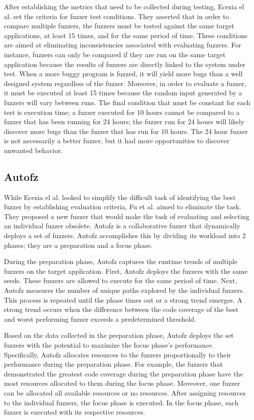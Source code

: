 After establishing the metrics that need to be collected during testing, Ecezia el al. 
set the criteria for fuzzer test conditions. They asserted that in order to compare 
multiple fuzzers, the fuzzers must be tested against the same target applications, at 
least 15 times, and for the same period of time. These conditions are aimed at eliminating 
inconsistencies associated with evaluating fuzzers. For instance, fuzzers can only be 
compared if they are run on the same target application because the results of fuzzers 
are directly linked to the system under test. When a more buggy program is fuzzed, it 
will yield more bugs than a well designed system regardless of the fuzzer. Moreover, 
in order to evaluate a fuzzer, it must be executed at least 15 times because the random 
input generated by a fuzzers will vary between runs. The final condition that must be 
constant for each test is execution time; a fuzzer executed for 10 hours cannot be 
compared to a fuzzer that has been running for 24 hours; the fuzzer run for 24 hours 
will likely discover more bugs than the fuzzer that has run for 10 hours. The 24 hour 
fuzzer is not necessarily a better fuzzer, but it had more opportunities to discover 
unwanted behavior. \cite{Ecezia}

\subsection{Autofz}
While Ecezia el al. looked to simplify the difficult task of identifying the best 
fuzzer by establishing evaluation criteria, Fu et al. aimed to eliminate the task. 
They proposed a new fuzzer that would make the task of evaluating and selecting an 
individual fuzzer obsolete. Autofz is a collaborative fuzzer that dynamically deploys 
a set of fuzzers. Autofz accomplishes this by dividing its workload into 2 phases; 
they are a preparation and a focus phase. 

During the preparation phase, Autofz captures the runtime trends of multiple fuzzers
on the target application. First, Autofz deploys the fuzzers with the same seeds. 
These fuzzers are allowed to execute for the same period of time. Next, Autofz 
measures the number of unique paths explored by the individual fuzzers. This 
process is repeated until the phase times out or a strong trend emerges. A strong 
trend occurs when the difference between the code coverage of the best and worst 
performing fuzzer exceeds a predetermined threshold. 

Based on the data collected in the preparation phase, Autofz deploys 
the set fuzzers with the potential to maximize the focus phase’s performance.
Specifically, Autofz allocates resources to the fuzzers proportionally 
to their performance during the preparation phase. For example, the fuzzers
that demonstrated the greatest code coverage during the preparation phase 
have the most resources allocated to them during the focus phase. Moveover, 
one fuzzer can be allocated all available resources or no resources. After 
assigning resources to the individual fuzzers, the focus phase is executed. In 
the focus phase, each fuzzer is executed with its respective resources.

